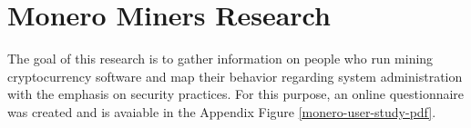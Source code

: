 \documentclass[
  printed, %
  table,   %
  lof,     %
  lot,     %
           oneside, color
]{fithesis3}
\begin{document}

\chapter{Monero Miners Research}
The goal of this research is to gather information on people who run mining cryptocurrency software and map their behavior regarding system administration with the emphasis on security practices. For this purpose, an online questionnaire was created and is avaiable in the Appendix Figure \ref{monero-user-study-pdf}. 
\end{document}
